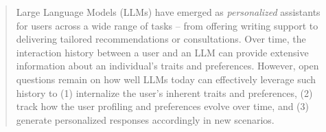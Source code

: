 \begin{abstract}


Large Language Models (LLMs) have emerged as \textit{personalized} assistants for users across a wide range of tasks -- from offering writing support to delivering tailored recommendations or consultations. Over time, the interaction history between a user and an LLM can provide extensive information about an individual's traits and preferences. However, open questions remain on how well LLMs today can effectively leverage such history to (1) internalize the user's inherent traits and preferences, (2) track how the user profiling and preferences evolve over time, and (3) generate personalized responses accordingly in new scenarios.


\end{abstract}
